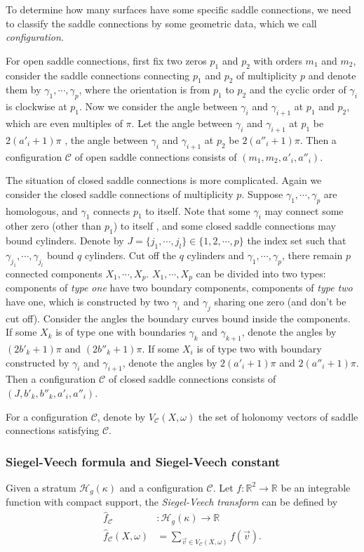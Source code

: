 \documentclass[12pt]{amsart} %
\theoremstyle{definition}
\theoremstyle{remark}
\numberwithin{equation}{section}
\renewcommand\H{{\mathcal H}}
\begin{document}
To determine how many surfaces have some specific saddle connections, we need to classify the saddle connections by some geometric data,
which we call \emph{configuration}.

For open saddle connections, first fix two zeros $p_1$ and $p_2$ with orders $m_1$ and $m_2$, 
consider the saddle connections connecting $p_1$ and $p_2$ of multiplicity $p$ and denote them by $\gamma_1,\cdots,\gamma_p$,
where the orientation is from $p_1$ to $p_2$ and the cyclic order of $\gamma_i$ is clockwise at $p_1$.
Now we consider the angle between $\gamma_i$ and $\gamma_{i+1}$ at $p_1$ and $p_2$, which are even multiples of $\pi$.
Let the angle between $\gamma_i$ and $\gamma_{i+1}$ at $p_1$ be $2(a'_i+1)\pi$ , 
the angle between $\gamma_i$ and $\gamma_{i+1}$ at $p_2$ be $2(a''_i+1)\pi$.
Then a configuration $\mathcal{C}$ of open saddle connections consists of $(m_1,m_2,a'_i,a''_i)$.

The situation of closed saddle connections is more complicated. Again we consider the closed saddle connections of multiplicity $p$.
Suppose $\gamma_1,\cdots,\gamma_p$ are homologous, and $\gamma_1$ connects $p_1$ to itself.
Note that some $\gamma_i$ may connect some other zero (other than $p_1$) to itself , and some closed saddle connections may bound cylinders.
Denote by $J=\{j_1,\cdots,j_l\}\in \{1,2,\cdots,p\}$ the index set such that $\gamma_{j_1},\cdots, \gamma_{j_l}$ bound $q$ cylinders.
Cut off the $q$ cylinders and $\gamma_1,\cdots,\gamma_p$, there remain $p$ connected components $X_1,\cdots,X_p$. 
$X_1,\cdots,X_p$ can be divided into two types: components of \emph{type one} have two boundary components, components of \emph{type two} have one, 
which is constructed by two $\gamma_i$ and $\gamma_j$ sharing one zero (and don't be cut off).
Consider the angles the boundary curves bound inside the components.
If some $X_k$ is of type one with boundaries $\gamma_k$ and $\gamma_{k+1}$, denote the angles by $(2b'_k+1)\pi$ and $(2b''_k+1)\pi$.
If some $X_i$ is of type two with boundary constructed by $\gamma_i$ and $\gamma_{i+1}$, denote the angles by $2(a'_i+1)\pi$ and $2(a''_i+1)\pi$.
Then a configuration $\mathcal{C}$ of closed saddle connections consists of $(J,b'_k,b''_k,a'_i,a''_i)$.

For a configuration $\mathcal{C}$, denote by $V_{\mathcal{C}}(X,\omega)$ the set of holonomy vectors of saddle connections satisfying $\mathcal{C}$.

\subsubsection{Siegel-Veech formula and Siegel-Veech constant}
Given a stratum $\H_g(\kappa)$ and a configuration $\mathcal{C}$. Let $f:\mathbb{R}^2\to \mathbb{R}$ be an integrable function with compact support, 
the \emph{Siegel-Veech transform} can be defined by
\begin{equation*}
\begin{aligned}
\hat{f}_{\mathcal{C}}&:\H_g(\kappa) \to \mathbb{R} \\
\hat{f}_{\mathcal{C}}(X,\omega)&=\sum_{\vec{v}\in V_{\mathcal{C}}(X,\omega)}f(\vec{v}).
\end{aligned}
\end{equation*}
\end{document}
